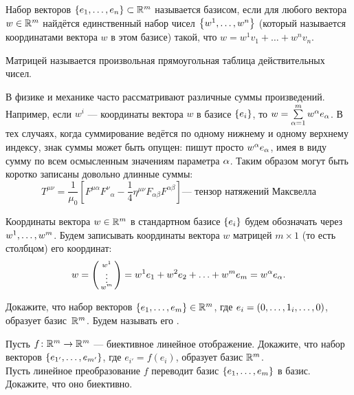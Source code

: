 \documentclass[a4paper,12pt]{article}
\begin{document}

Набор векторов $\left\{e_1,\ldots, e_n\right\}\subset\mathbb{R}^m$ называется базисом, если для любого вектора $w\in\mathbb{R}^m$ найдётся единственный набор чисел $\left\{w^1,\ldots, w^n\right\}$ (который называется координатами вектора $w$ в этом базисе) такой, что
$w = w^1 v_1 + \ldots + w^n v_n$.

     Матрицей называется произвольная прямоугольная таблица действительных чисел.

В физике и механике часто рассматривают различные суммы произведений.
Например, если $w^i$ --- координаты вектора $w$ в базисе $\left\{e_i\right\}$, то $w = \sum\limits_{\alpha=1}^{m}w^\alpha e_\alpha$.
В тех случаях, когда суммирование ведётся по одному нижнему и одному верхнему индексу, знак суммы может быть опущен:
пишут просто $w^\alpha e_\alpha$, имея в виду сумму по всем осмысленным значениям параметра $\alpha$.
Таким образом могут быть коротко записаны довольно длинные суммы:
\vspace*{-2mm}
$$
T^{\mu\nu} = \frac{1}{\mu_0} \left[ F^{\mu \alpha}F^\nu{}_{\alpha} - \frac{1}{4} \eta^{\mu\nu}F_{\alpha\beta} F^{\alpha\beta}\right] \text{--- тензор натяжений Максвелла}$$
\vspace*{-4mm}

\noindent
Координаты вектора $w\in\mathbb{R}^m$ в стандартном базисе $\left\{e_i\right\}$ будем обозначать через $w^1,\ldots, w^m$.
Будем записывать координаты вектора $w$ матрицей $m\times 1$ (то есть столбцом) его координат:
\vspace*{-2mm}
    $$ w = \left(\begin{smallmatrix}w^1\\\vdots\\w^m\end{smallmatrix}\right) = w^1 e_1 + w^2 e_2 + \ldots +  w^m e_m = w^\alpha e_\alpha.$$
\vspace*{-6mm}




    Докажите, что набор векторов $\left\{e_1,\ldots, e_m\right\}\in\mathbb{R}^m$, где $e_i=(0,\ldots,1_i,\ldots,0)$, образует базис~$\mathbb{R}^m$.
    Будем называть его .

    Пусть $f\colon\mathbb{R}^m\rightarrow\mathbb{R}^m$ --- биективное линейное отображение. Докажите, что набор векторов $\left\{e_{1'},\ldots, e_{m'}\right\}$, где $e_{i'}=f(e_i)$, образует базис $\mathbb{R}^m$.\\
    Пусть линейное преобразование $f$ переводит базис $\left\{e_1,\ldots, e_m\right\}$ в базис. Докажите, что оно биективно.
\end{document}
